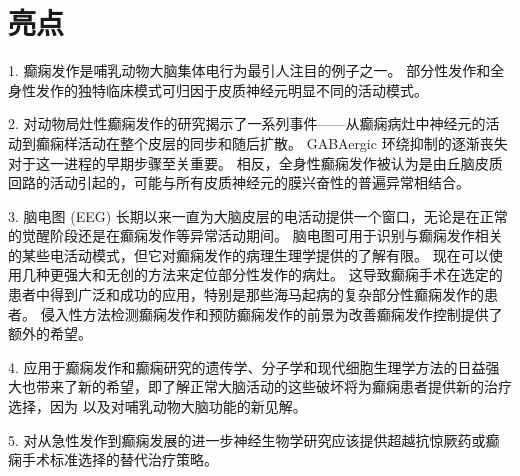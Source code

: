 \section{亮点}

1. 癫痫发作是哺乳动物大脑集体电行为最引人注目的例子之一。
部分性发作和全身性发作的独特临床模式可归因于皮质神经元明显不同的活动模式。


2. 对动物局灶性癫痫发作的研究揭示了一系列事件——从癫痫病灶中神经元的活动到癫痫样活动在整个皮层的同步和随后扩散。
GABAergic 环绕抑制的逐渐丧失对于这一进程的早期步骤至关重要。
相反，全身性癫痫发作被认为是由丘脑皮质回路的活动引起的，可能与所有皮质神经元的膜兴奋性的普遍异常相结合。


3. 脑电图 (EEG) 长期以来一直为大脑皮层的电活动提供一个窗口，无论是在正常的觉醒阶段还是在癫痫发作等异常活动期间。
脑电图可用于识别与癫痫发作相关的某些电活动模式，但它对癫痫发作的病理生理学提供的了解有限。
现在可以使用几种更强大和无创的方法来定位部分性发作的病灶。
这导致癫痫手术在选定的患者中得到广泛和成功的应用，特别是那些海马起病的复杂部分性癫痫发作的患者。
侵入性方法检测癫痫发作和预防癫痫发作的前景为改善癫痫发作控制提供了额外的希望。


4. 应用于癫痫发作和癫痫研究的遗传学、分子学和现代细胞生理学方法的日益强大也带来了新的希望，即了解正常大脑活动的这些破坏将为癫痫患者提供新的治疗选择，因为 以及对哺乳动物大脑功能的新见解。


5. 对从急性发作到癫痫发展的进一步神经生物学研究应该提供超越抗惊厥药或癫痫手术标准选择的替代治疗策略。

